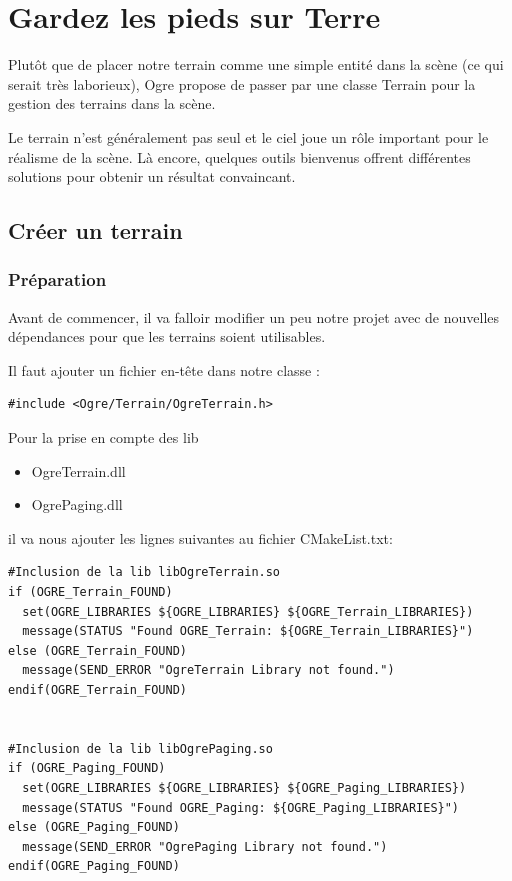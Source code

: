 
\chapter{Gardez les pieds sur Terre}
Plutôt que de placer notre terrain comme une simple entité dans la scène (ce qui serait très laborieux), Ogre propose de passer par une classe Terrain pour la gestion des terrains dans la scène.

Le terrain n'est généralement pas seul et le ciel joue un rôle important pour le réalisme de la scène. Là encore, quelques outils bienvenus offrent différentes solutions pour obtenir un résultat convaincant.



\section{Créer un terrain}


\subsection{Préparation}

Avant de commencer, il va falloir modifier un peu notre projet avec de nouvelles dépendances pour que les terrains soient utilisables.

Il faut ajouter un fichier en-tête dans notre classe :

\begin{lstlisting}[caption={Ajout du fichier d'entête pour la gestion des terrains}]
#include <Ogre/Terrain/OgreTerrain.h>
\end{lstlisting}

Pour la prise en compte des lib
\begin{itemize}
\item OgreTerrain.dll
\item OgrePaging.dll
\end{itemize}

il va nous ajouter les lignes suivantes au fichier CMakeList.txt:

\begin{lstlisting}[caption={Modification de CMakeLists.txt pour l'inclusion des lib Terrain et Paging}]
#Inclusion de la lib libOgreTerrain.so
if (OGRE_Terrain_FOUND)
  set(OGRE_LIBRARIES ${OGRE_LIBRARIES} ${OGRE_Terrain_LIBRARIES})
  message(STATUS "Found OGRE_Terrain: ${OGRE_Terrain_LIBRARIES}")
else (OGRE_Terrain_FOUND)
  message(SEND_ERROR "OgreTerrain Library not found.")
endif(OGRE_Terrain_FOUND)


#Inclusion de la lib libOgrePaging.so
if (OGRE_Paging_FOUND)
  set(OGRE_LIBRARIES ${OGRE_LIBRARIES} ${OGRE_Paging_LIBRARIES})
  message(STATUS "Found OGRE_Paging: ${OGRE_Paging_LIBRARIES}")
else (OGRE_Paging_FOUND)
  message(SEND_ERROR "OgrePaging Library not found.")
endif(OGRE_Paging_FOUND)
\end{lstlisting}

